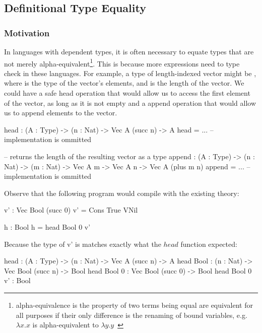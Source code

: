\subsection{Definitional Type Equality}

\subsubsection{Motivation}

In languages with dependent types, it is often necessary to equate types that are not merely alpha-equivalent\footnote{alpha-equivalence is the property of two terms being equal are equivalent for all purposes if their only difference is the renaming of bound variables, e.g. $\lambda x.x$ is alpha-equivalent to $\lambda y.y$~\cite{nlab:alpha-equivalence}}. This is because more expressions need to type check in these languages.
For example, a type of length-indexed vector might be , where  is the type of the vector's elements, and  is the length of the vector.
We could have a safe head operation that would allow us to access the first element of the vector, as long as it is not empty and a append operation that would allow us to append elements to the vector.

\begin{piforall}
       head : (A : Type) -> (n : Nat) -> Vec A (succ n) -> A
       head = ... -- implementation is ommitted

       -- returns the length of the resulting vector as a type
       append : (A : Type) -> (n : Nat) -> (m : Nat) -> Vec A m -> Vec A n -> Vec A (plus m n)
       append = ... -- implementation is ommitted
\end{piforall}

Observe that the following program would compile with the existing theory:

\begin{piforall}
       v' : Vec Bool (succ 0)
       v' = Cons True VNil

       h : Bool
       h = head Bool 0 v'
\end{piforall}


Because the type of v' is  matches exactly what the $head$ function expected:

\begin{piforall}
       head : (A : Type) -> (n : Nat) -> Vec A (succ n) -> A
       head Bool : (n : Nat) -> Vec Bool (succ n) -> Bool
       head Bool 0 : Vec Bool (succ 0) -> Bool
       head Bool 0 v' : Bool
\end{piforall}


